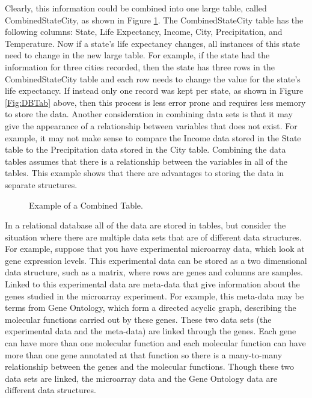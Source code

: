 \documentclass{article}[11pt]
\begin{document}
Clearly, this information could be combined into one large table, called
CombinedStateCity, as shown in Figure \ref{Fig:OneDBTab}.  The
CombinedStateCity table has the following columns: State, Life
Expectancy, Income, City, Precipitation, and Temperature.  Now if a state's
life expectancy changes, all instances of this state need to change
in the new large table.  For example, if the state had the information for
three cities recorded, then the state has three rows in the
CombinedStateCity table and each row needs to change the value for the
state's life expectancy.  If instead only one record was kept per state, as
shown in Figure \ref{Fig:DBTab} above, then this process is less error
prone and requires less memory to store the data.  Another consideration in
combining data sets is that it may give the appearance of a relationship
between variables that does not exist.  For example, it may not make sense to
compare the Income data stored in the State table to the Precipitation data
stored in the City table.  Combining the data tables assumes that there is a
relationship between the variables in all of the tables.  This example shows
that there are advantages to storing the data in separate structures.


\begin{figure}[ht]
  \begin{center}
    \caption{ Example of a Combined Table. }
    \label{Fig:OneDBTab}
  \end{center}
\end{figure}

In a relational database all of the data are stored in tables, but consider the
situation where there are multiple data sets that are of different data
structures.  For example, suppose that you have experimental microarray data,
which look at gene expression levels.  This experimental data can be
stored as a two dimensional data structure, such as a matrix, where rows are
genes and columns are samples.  Linked to this experimental data are meta-data
that give information about the genes studied in the microarray experiment.
For example, this meta-data may be terms from Gene Ontology, which form a
directed acyclic graph, describing the molecular functions carried out by
these genes.  These two data sets (the experimental data and the meta-data)
are linked through the genes.  Each gene can have more than one molecular
function and each molecular function can have more than one gene annotated at
that function so there is a many-to-many relationship between the genes and
the molecular functions.  Though these two data sets are linked, the
microarray data and the Gene Ontology data are different data structures.   
\end{document}
